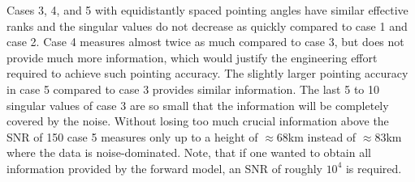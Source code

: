 Cases 3, 4, and 5 with equidistantly spaced pointing angles have similar effective ranks and the singular values do not decrease as quickly compared to case 1 and case 2.
Case 4 measures almost twice as much compared to case 3, but does not provide much more information, which would justify the engineering effort required to achieve such pointing accuracy.
The slightly larger pointing accuracy in case 5 compared to case 3 provides similar information.
The last 5 to 10 singular values of case 3 are so small that the information will be completely covered by the noise.
Without losing too much crucial information above the SNR of 150 case 5 measures only up to a height of $\approx 68$km instead of $\approx83$km where the data is noise-dominated.
Note, that if one wanted to obtain all information provided by the forward model, an SNR of roughly $10^4$ is required.
% 
